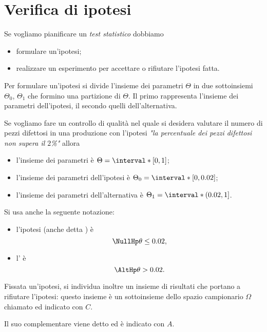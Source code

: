 \section{Verifica di ipotesi}

Se vogliamo pianificare un \emph{test statistico} dobbiamo \begin{itemize}
    \item formulare un'ipotesi;
    \item realizzare un esperimento per accettare o rifiutare l'ipotesi fatta.
\end{itemize}

Per formulare un'ipotesi si divide l'insieme dei parametri $\Theta$ in due sottoinsiemi $\Theta_0$, $\Theta_1$ che formino una partizione di $\Theta$. Il primo rappresenta l'insieme dei parametri dell'ipotesi, il secondo quelli dell'alternativa.

\begin{example}
    Se vogliamo fare un controllo di qualità nel quale si desidera valutare il numero di pezzi difettosi in una produzione con l'ipotesi \emph{"la percentuale dei pezzi difettosi non supera il $2$\%"} allora \begin{itemize}
        \item l'insieme dei parametri è $\Theta = \interval*[{0, 1}]$;
        \item l'insieme dei parametri dell'ipotesi è $\Theta_0 = \interval*[{0, 0.02}]$;
        \item l'insieme dei parametri dell'alternativa è $\Theta_1 = \interval*({0.02, 1}]$.
    \end{itemize}
\end{example}

Si usa anche la seguente notazione:
\begin{itemize}
    \item l'ipotesi (anche detta ) è \[
        \NullHp \theta \leq 0.02,    
    \]
    \item l' è \[
        \AltHp \theta > 0.02.    
    \]
\end{itemize}

Fissata un'ipotesi, si individua inoltre un insieme di risultati che portano a rifiutare l'ipotesi: questo insieme è un sottoinsieme dello spazio campionario $\Omega$ chiamato  ed indicato con $C$.

Il suo complementare viene detto  ed è indicato con $A$.

